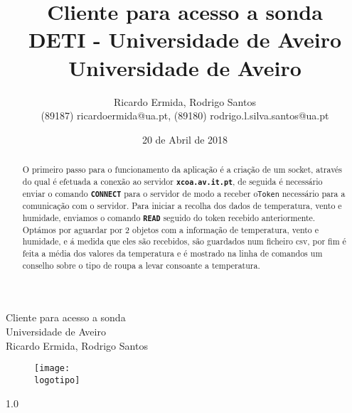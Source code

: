 \documentclass[a4paper]{report}
\begin{document}
%
\def\titulo{Cliente para acesso a sonda}
\def\data{20 de Abril de 2018}
\def\autores{Ricardo Ermida, Rodrigo Santos}
\def\autorescontactos{(89187) ricardoermida@ua.pt, (89180) rodrigo.l.silva.santos@ua.pt}
\def\versao{1.0}
\def\departamento{DETI - Universidade de Aveiro}
\def\empresa{Universidade de Aveiro}
\def\logotipo{ua.pdf}
%
%
\begin{titlepage}

\begin{center}
%
\vspace*{50mm}
%
{\Huge \titulo}\\ 
%
\vspace{10mm}
%
{\Large \empresa}\\
%
\vspace{10mm}
%
{\LARGE \autores}\\ 
%
\vspace{30mm}
%
\begin{figure}[h]
\center
\texttt{[image: \\logotipo]}
\end{figure}
%
\vspace{30mm}
\end{center}
%
\begin{flushright}
\versao
\end{flushright}
\end{titlepage}

\title{%
{\Huge\textbf{\titulo}}\\
{\Large \departamento\\ \empresa}
}
%
\author{%
    \autores \\
    \autorescontactos
}
%
\date{\data}
%
\maketitle


\begin{abstract}
O primeiro passo para o funcionamento da aplicação é a criação de um socket, através do qual é efetuada a conexão ao servidor \textbf{\texttt{xcoa.av.it.pt}}, de seguida é necessário enviar o comando \textbf{\texttt{CONNECT}} para o servidor de modo a receber o\texttt{Token} necessário para a comunicação com o servidor. Para iniciar a recolha dos dados de temperatura, vento e humidade, enviamos o comando \textbf{\texttt{READ}} seguido do token recebido anteriormente. Optámos por aguardar por 2 objetos com a informação de temperatura, vento e humidade, e á medida que eles são recebidos, são guardados num ficheiro \ac{csv}, por fim é feita a média dos valores da temperatura e é mostrado na linha de comandos um conselho sobre o tipo de roupa a levar consoante a temperatura.

\end{abstract}
\end{document}
